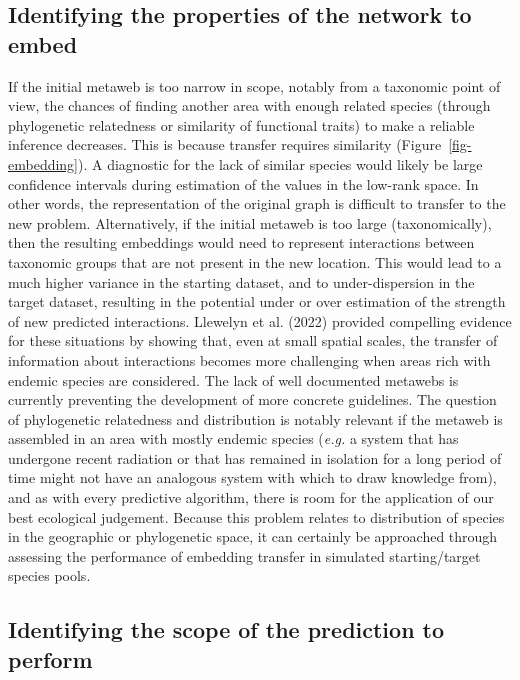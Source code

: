 \documentclass[
  letterpaper,
  DIV=11,
  numbers=noendperiod]{scrartcl}
\begin{document}
\hypertarget{identifying-the-properties-of-the-network-to-embed}{%
\subsection{Identifying the properties of the network to
embed}\label{identifying-the-properties-of-the-network-to-embed}}

If the initial metaweb is too narrow in scope, notably from a taxonomic
point of view, the chances of finding another area with enough related
species (through phylogenetic relatedness or similarity of functional
traits) to make a reliable inference decreases. This is because transfer
requires similarity (Figure~\ref{fig-embedding}). A diagnostic for the
lack of similar species would likely be large confidence intervals
during estimation of the values in the low-rank space. In other words,
the representation of the original graph is difficult to transfer to the
new problem. Alternatively, if the initial metaweb is too large
(taxonomically), then the resulting embeddings would need to represent
interactions between taxonomic groups that are not present in the new
location. This would lead to a much higher variance in the starting
dataset, and to under-dispersion in the target dataset, resulting in the
potential under or over estimation of the strength of new predicted
interactions. Llewelyn et al. (2022) provided compelling evidence for
these situations by showing that, even at small spatial scales, the
transfer of information about interactions becomes more challenging when
areas rich with endemic species are considered. The lack of well
documented metawebs is currently preventing the development of more
concrete guidelines. The question of phylogenetic relatedness and
distribution is notably relevant if the metaweb is assembled in an area
with mostly endemic species (\emph{e.g.} a system that has undergone
recent radiation or that has remained in isolation for a long period of
time might not have an analogous system with which to draw knowledge
from), and as with every predictive algorithm, there is room for the
application of our best ecological judgement. Because this problem
relates to distribution of species in the geographic or phylogenetic
space, it can certainly be approached through assessing the performance
of embedding transfer in simulated starting/target species pools.

\hypertarget{identifying-the-scope-of-the-prediction-to-perform}{%
\subsection{Identifying the scope of the prediction to
perform}\label{identifying-the-scope-of-the-prediction-to-perform}}
\end{document}
